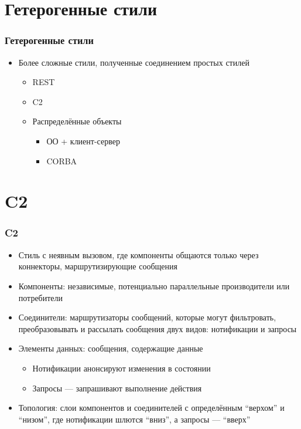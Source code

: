 \documentclass[xetex,mathserif,serif]{beamer}
\begin{document}
	\section{Гетерогенные стили}

	\begin{frame}
		\frametitle{Гетерогенные стили}
		\begin{itemize}
			\item Более сложные стили, полученные соединением простых стилей
			\begin{itemize}
				\item REST
				\item C2
				\item Распределённые объекты
				\begin{itemize}
					\item ОО + клиент-сервер
					\item CORBA
				\end{itemize}
			\end{itemize}
		\end{itemize}
	\end{frame}

	\section{C2}

	\begin{frame}
		\frametitle{C2}
		\begin{itemize}
			\item Стиль с неявным вызовом, где компоненты общаются только через коннекторы, маршрутизирующие сообщения
			\item Компоненты: независимые, потенциально параллельные производители или потребители
			\item Соединители: маршрутизаторы сообщений, которые могут фильтровать, преобразовывать и рассылать сообщения двух видов: нотификации и запросы
			\item Элементы данных: сообщения, содержащие данные
			\begin{itemize}
				\item Нотификации анонсируют изменения в состоянии
				\item Запросы --- запрашивают выполнение действия
			\end{itemize}
			\item Топология: слои компонентов и соединителей с определённым ``верхом'' и ``низом'', где нотификации шлются ``вниз'', а запросы --- ``вверх''
		\end{itemize}
	\end{frame}
\end{document}
